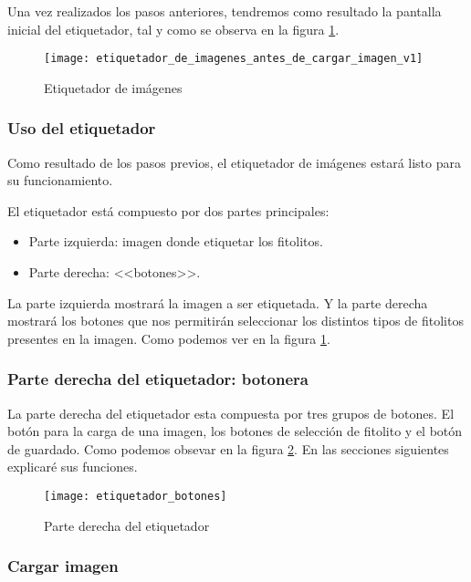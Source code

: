 Una vez realizados los pasos anteriores, tendremos como resultado la pantalla inicial del etiquetador, tal y como se observa en la figura \ref{fig:E.4.3}.

\begin{figure}
\centering
\texttt{[image: etiquetador\_de\_imagenes\_antes\_de\_cargar\_imagen\_v1]}
\caption{Etiquetador de imágenes}
\label{fig:E.4.3}
\end{figure}

\subsubsection{Uso del etiquetador}

Como resultado de los pasos previos, el etiquetador de imágenes estará listo para su funcionamiento. 

El etiquetador está compuesto por dos partes principales:

\begin{itemize}
	\item Parte izquierda: imagen donde etiquetar los fitolitos.
	\item Parte derecha: \textrm{<<botones>>}.	
\end{itemize}

La parte izquierda mostrará la imagen a ser etiquetada. Y la parte derecha mostrará los botones que nos permitirán seleccionar los distintos tipos de fitolitos presentes en la imagen. Como podemos ver en la figura \ref{fig:E.4.3}.

\subsubsection{Parte derecha del etiquetador: botonera}
La parte derecha del etiquetador esta compuesta por tres grupos de botones. El botón para la carga de una imagen, los botones de selección de fitolito y el botón de guardado. Como podemos obsevar en la figura \ref{fig:E.4.7}. En las secciones siguientes explicaré sus funciones. 

\begin{figure}[h]
\centering
\texttt{[image: etiquetador\_botones]}
\caption{Parte derecha del etiquetador}
\label{fig:E.4.7}
\end{figure}

\subsubsection{Cargar imagen}

